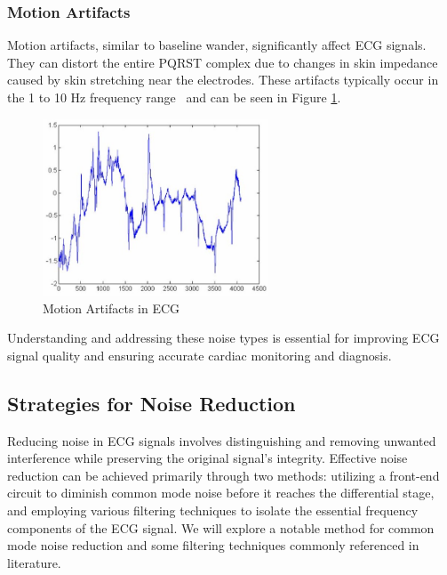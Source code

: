 \subsubsection{Motion Artifacts}
\vspace{1em}
\noindent Motion artifacts, similar to baseline wander, significantly affect ECG signals. They can distort the entire PQRST complex due to changes in skin impedance caused by skin stretching near the electrodes. These artifacts typically occur in the 1 to 10 Hz frequency range~\cite{Kher2019SignalPT} and can be seen in Figure \ref{fig:motion_artifacts}.

\begin{figure}[h]
	\centering
	\includegraphics[width=0.6\textwidth]{images/motionArtifacts}
	\caption{Motion Artifacts in ECG \cite{Kher2019SignalPT}}
	\label{fig:motion_artifacts}
\end{figure}

\noindent Understanding and addressing these noise types is essential for improving ECG signal quality and ensuring accurate cardiac monitoring and diagnosis.\\


\subsection{Strategies for Noise Reduction}
\vspace{1em}
\noindent Reducing noise in ECG signals involves distinguishing and removing unwanted interference while preserving the original signal's integrity. Effective noise reduction can be achieved primarily through two methods: utilizing a front-end circuit to diminish common mode noise before it reaches the differential stage, and employing various filtering techniques to isolate the essential frequency components of the ECG signal. We will explore a notable method for common mode noise reduction and some filtering techniques commonly referenced in literature.\\

